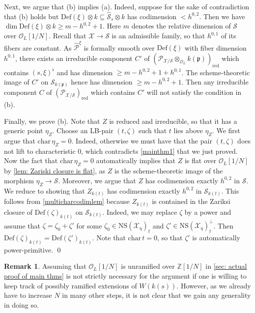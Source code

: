 \documentclass[letter, 11pt]{article}
\theoremstyle{plain}
\theoremstyle{definition}
\newtheorem{remark}[subsubsection]{Remark}
\newcommand{\IZ}{\mathbb{Z}}
\newcommand\tensor{{\otimes}}
\newcommand{\<}{\langle}
\renewcommand{\>}{\rangle}
\newcommand{\fp}{\mathfrak{p}}
\newcommand{\sX}{\mathcal{X}}
\newcommand{\sS}{\mathcal{S}}
\newcommand{\sO}{\mathcal{O}}
\newcommand{\shP}{\mathscr{P}}
\newcommand{\Def}{\mathrm{Def}}
\newcommand{\NS}{\mathrm{NS}}
\newcommand{\red}{\mathrm{red}}
\begin{document}
Next, we argue that (b) implies (a). Indeed, suppose for the sake of contradiction that (b) holds but $\Def(\xi) \tensor k \subseteq \hat{\sS}_s \tensor k$ has codimension $< h^{0, 2}$. Then we have $\dim \Def(\xi) \tensor k \ge m - h^{0, 2} + 1$. Here $m$ denotes the relative dimension of $\sS$ over $\sO_L[1/N]$. Recall that $\sX \to \sS$ is an admissible family, so that $h^{0, 1}$ of its fibers are constant. As $\hat{\shP}^\xi$ is formally smooth over $\Def(\xi)$ with fiber dimension $h^{0, 1}$, there exists an irreducible component $C'$ of $(\shP_{\sX/\sS} \tensor_{\sO_L} k(\fp))_\red$ which contains $(s, \xi)^\flat$ and has dimension $\ge m - h^{0, 2} + 1 + h^{0, 1}$. The scheme-theoretic image of $C'$ on $\sS_{k(\fp)}$ hence has dimension $\ge m - h^{0, 2} + 1$. Then any irreducible component $C$ of $(\shP_{\sX/\sS})_\red$ which contains $C'$ will not satisfy the condition in (b). 

Finally, we prove (b). Note that $Z$ is reduced and irreducible, so that it has a generic point $\eta_{Z}$. Choose an LB-pair $(t, \zeta)$ such that $t$ lies above $\eta_Z$. We first argue that $\mathrm{char\,} \eta_{Z} = 0$. Indeed, otherwise we must have that the pair $(t, \zeta)$ does not lift to characteristic $0$, which contradicts \ref{mainthm1} that we just proved. Now the fact that $\mathrm{char\,} \eta_{Z} = 0$ automatically implies that $Z$ is flat over $\sO_{L}[1/N]$ by \ref{lem: Zariski closure is flat}, as $Z$ is the scheme-theoretic image of the morphism $\eta_{Z} \to \sS$. Moreover, we argue that $Z$ has codimension exactly $h^{0, 2}$ in $\sS$. We reduce to showing that $Z_{k(t)}$ has codimension exactly $h^{0, 2}$ in $\sS_{k(t)}$. This follows from \ref{multicharcodimlem} because $Z_{k(t)}$ is contained in the Zariksi closure of $\Def(\zeta)_{k(t)}$ on $\sS_{k(t)}$. Indeed, we may replace $\zeta$ by a power and assume that $\zeta = \zeta_0 + \zeta'$ for some $\zeta_0 \in \NS(\sX_\eta)_t$ and $\zeta' \in \NS(\sX_\eta)_t^\perp$. Then $\Def(\zeta)_{k(t)} = \Def(\zeta')_{k(t)}$. Note that $\mathrm{char\,} t = 0$, so that $\zeta'$ is automatically power-primitive. \qed



\begin{remark}
    Assuming that $\sO_L[1/N]$ is unramified over $\IZ[1/N]$ in \ref{sec: actual proof of main thms} is not strictly necessary for the argument if one is willing to keep track of possibly ramified extensions of $W(k(s))$. However, as we already have to increase $N$ in many other steps, it is not clear that we gain any generality in doing so. 
\end{remark}
\end{document}
